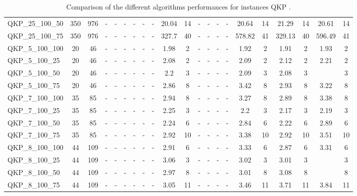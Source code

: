 \begin{sidewaystable}[!ht]
{\begin{tabular}{lcccccccccccccccccccc}
QKP\_25\_100\_50 & 350 & 976 &  - &  - &  - &  - &  - &  - &  \textcolor{blue2}{20.04} & 14 &  - &  - &  - &  - & 20.64 & 14 & 21.29 & 14 & 20.61 & 14 \\
QKP\_25\_100\_75 & 350 & 976 &  - &  - &  - &  - &  - &  - &  \textcolor{blue2}{327.7} & 40 &  - &  - &  - &  - & 578.82 & 41 & 329.13 & 40 & 596.49 & 41 \\
QKP\_5\_100\_100 & 20 & 46 &  - &  - &  - &  - &  - &  - & 1.98 & 2 &  - &  - &  - &  - & 1.92 & 2 &  \textcolor{blue2}{1.91} & 2 & 1.93 & 2 \\
QKP\_5\_100\_25 & 20 & 46 &  - &  - &  - &  - &  - &  - &  \textcolor{blue2}{2.08} & 2 &  - &  - &  - &  - & 2.09 & 2 & 2.12 & 2 & 2.21 & 2 \\
QKP\_5\_100\_50 & 20 & 46 &  - &  - &  - &  - &  - &  - & 2.2 & 3 &  - &  - &  - &  - & 2.09 & 3 &  \textcolor{blue2}{2.08} & 3 &  \textcolor{blue2}{2.08 & 3 \\
QKP\_5\_100\_75 & 20 & 46 &  - &  - &  - &  - &  - &  - &  \textcolor{blue2}{2.86} & 8 &  - &  - &  - &  - & 3.42 & 8 & 2.93 & 8 & 3.22 & 8 \\
QKP\_7\_100\_100 & 35 & 85 &  - &  - &  - &  - &  - &  - & 2.94 & 8 &  - &  - &  - &  - & 3.27 & 8 &  \textcolor{blue2}{2.89} & 8 & 3.38 & 8 \\
QKP\_7\_100\_25 & 35 & 85 &  - &  - &  - &  - &  - &  - & 2.25 & 3 &  - &  - &  - &  - & 2.2 & 3 &  \textcolor{blue2}{2.17} & 3 & 2.19 & 3 \\
QKP\_7\_100\_50 & 35 & 85 &  - &  - &  - &  - &  - &  - & 2.24 & 6 &  - &  - &  - &  - & 2.84 & 6 &  \textcolor{blue2}{2.22} & 6 & 2.89 & 6 \\
QKP\_7\_100\_75 & 35 & 85 &  - &  - &  - &  - &  - &  - &  \textcolor{blue2}{2.92} & 10 &  - &  - &  - &  - & 3.38 & 10 &  \textcolor{blue2}{2.92} & 10 & 3.51 & 10 \\
QKP\_8\_100\_100 & 44 & 109 &  - &  - &  - &  - &  - &  - & 2.91 & 6 &  - &  - &  - &  - & 3.33 & 6 &  \textcolor{blue2}{2.87} & 6 & 3.31 & 6 \\
QKP\_8\_100\_25 & 44 & 109 &  - &  - &  - &  - &  - &  - & 3.06 & 3 &  - &  - &  - &  - & 3.02 & 3 & 3.01 & 3 &  \textcolor{blue2}{2.96 & 3 \\
QKP\_8\_100\_50 & 44 & 109 &  - &  - &  - &  - &  - &  - & 2.97 & 8 &  - &  - &  - &  - & 3.01 & 8 & 3.08 & 8 &  \textcolor{blue2}{2.96 & 8 \\
QKP\_8\_100\_75 & 44 & 109 &  - &  - &  - &  - &  - &  - &  \textcolor{blue2}{3.05} & 11 &  - &  - &  - &  - & 3.46 & 11 & 3.71 & 11 & 3.84 & 11 \\
\bottomrule
\end{tabular}
}%
\caption{Comparison of the different algorithms performances for instances QKP .}
\label{tab:table_compare_QKP }
\end{sidewaystable}
